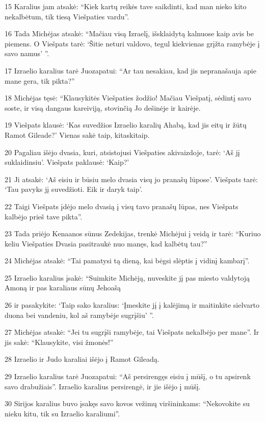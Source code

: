 \par 15 Karalius jam atsakė: “Kiek kartų reikės tave saikdinti, kad man nieko kito nekalbėtum, tik tiesą Viešpaties vardu”. 
\par 16 Tada Michėjas atsakė: “Mačiau visą Izraelį, išsklaidytą kalnuose kaip avis be piemens. O Viešpats tarė: ‘Šitie neturi valdovo, tegul kiekvienas grįžta ramybėje į savo namus’ ”. 
\par 17 Izraelio karalius tarė Juozapatui: “Ar tau nesakiau, kad jis nepranašauja apie mane gera, tik pikta?” 
\par 18 Michėjas tęsė: “Klausykitės Viešpaties žodžio! Mačiau Viešpatį, sėdintį savo soste, ir visą dangaus kareiviją, stovinčią Jo dešinėje ir kairėje. 
\par 19 Viešpats klausė: ‘Kas suvedžios Izraelio karalių Ahabą, kad jis eitų ir žūtų Ramot Gileade?’ Vienas sakė taip, kitas­kitaip. 
\par 20 Pagaliau išėjo dvasia, kuri, atsistojusi Viešpaties akivaizdoje, tarė: ‘Aš jį suklaidinsiu’. Viešpats paklausė: ‘Kaip?’ 
\par 21 Ji atsakė: ‘Aš eisiu ir būsiu melo dvasia visų jo pranašų lūpose’. Viešpats tarė: ‘Tau pavyks jį suvedžioti. Eik ir daryk taip’. 
\par 22 Taigi Viešpats įdėjo melo dvasią į visų tavo pranašų lūpas, nes Viešpats kalbėjo prieš tave pikta”. 
\par 23 Tada priėjo Kenaanos sūnus Zedekijas, trenkė Michėjui į veidą ir tarė: “Kuriuo keliu Viešpaties Dvasia pasitraukė nuo manęs, kad kalbėtų tau?” 
\par 24 Michėjas atsakė: “Tai pamatysi tą dieną, kai bėgsi slėptis į vidinį kambarį”. 
\par 25 Izraelio karalius įsakė: “Suimkite Michėją, nuveskite jį pas miesto valdytoją Amoną ir pas karaliaus sūnų Jehoašą 
\par 26 ir pasakykite: ‘Taip sako karalius: ‘Įmeskite jį į kalėjimą ir maitinkite sielvarto duona bei vandeniu, kol aš ramybėje sugrįšiu’ ”. 
\par 27 Michėjas atsakė: “Jei tu sugrįši ramybėje, tai Viešpats nekalbėjo per mane”. Ir jis sakė: “Klausykite, visi žmonės!” 
\par 28 Izraelio ir Judo karaliai išėjo į Ramot Gileadą. 
\par 29 Izraelio karalius tarė Juozapatui: “Aš persirengęs eisiu į mūšį, o tu apsirenk savo drabužiais”. Izraelio karalius persirengė, ir jie išėjo į mūšį. 
\par 30 Sirijos karalius buvo įsakęs savo kovos vežimų viršininkams: “Nekovokite su nieku kitu, tik su Izraelio karaliumi”. 

